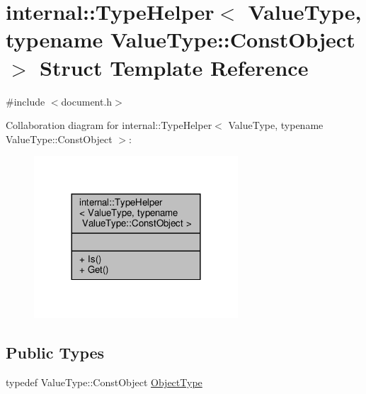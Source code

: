 \hypertarget{structinternal_1_1TypeHelper_3_01ValueType_00_01typename_01ValueType_1_1ConstObject_01_4}{}\section{internal\+:\+:Type\+Helper$<$ Value\+Type, typename Value\+Type\+:\+:Const\+Object $>$ Struct Template Reference}
\label{structinternal_1_1TypeHelper_3_01ValueType_00_01typename_01ValueType_1_1ConstObject_01_4}


{\ttfamily \#include $<$document.\+h$>$}



Collaboration diagram for internal\+:\+:Type\+Helper$<$ Value\+Type, typename Value\+Type\+:\+:Const\+Object $>$\+:
\nopagebreak
\begin{figure}[H]
\begin{center}
\leavevmode
\includegraphics[width=216pt]{structinternal_1_1TypeHelper_3_01ValueType_00_01typename_01ValueType_1_1ConstObject_01_4__coll__graph}
\end{center}
\end{figure}
\subsection*{Public Types}
\begin{DoxyCompactItemize}
\item 
typedef Value\+Type\+::\+Const\+Object \hyperlink{structinternal_1_1TypeHelper_3_01ValueType_00_01typename_01ValueType_1_1ConstObject_01_4_a986df6ac09ceb6cc9ba9fd4d73e90495}{Object\+Type}
\end{DoxyCompactItemize}
